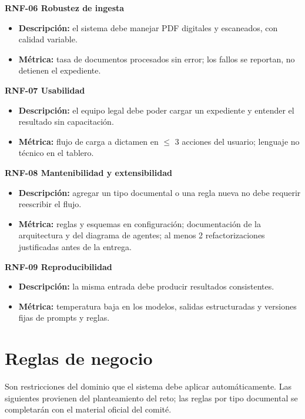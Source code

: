 \documentclass[11pt, a4paper]{article}
\begin{document}
\textbf{RNF-06 Robustez de ingesta}
\begin{itemize}
    \item \textbf{Descripción:} el sistema debe manejar PDF digitales y escaneados, con calidad variable.
    \item \textbf{Métrica:} tasa de documentos procesados sin error; los fallos se reportan, no detienen el expediente.
\end{itemize}

\textbf{RNF-07 Usabilidad}
\begin{itemize}
    \item \textbf{Descripción:} el equipo legal debe poder cargar un expediente y entender el resultado sin capacitación.
    \item \textbf{Métrica:} flujo de carga a dictamen en $\le$ 3 acciones del usuario; lenguaje no técnico en el tablero.
\end{itemize}

\textbf{RNF-08 Mantenibilidad y extensibilidad}
\begin{itemize}
    \item \textbf{Descripción:} agregar un tipo documental o una regla nueva no debe requerir reescribir el flujo.
    \item \textbf{Métrica:} reglas y esquemas en configuración; documentación de la arquitectura y del diagrama de agentes; al menos 2 refactorizaciones justificadas antes de la entrega.
\end{itemize}

\textbf{RNF-09 Reproducibilidad}
\begin{itemize}
    \item \textbf{Descripción:} la misma entrada debe producir resultados consistentes.
    \item \textbf{Métrica:} temperatura baja en los modelos, salidas estructuradas y versiones fijas de prompts y reglas.
\end{itemize}

\section{Reglas de negocio}

Son restricciones del dominio que el sistema debe aplicar automáticamente. Las siguientes provienen del planteamiento del reto; las reglas por tipo documental se completarán con el material oficial del comité.
\end{document}
